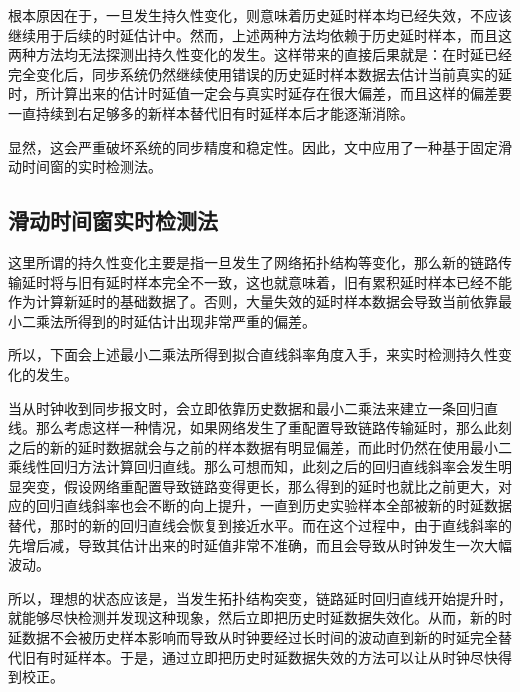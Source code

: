 根本原因在于，一旦发生持久性变化，则意味着历史延时样本均已经失效，不应该继续用于后续的时延估计中。然而，上述两种方法均依赖于历史延时样本，而且这两种方法均无法探测出持久性变化的发生。这样带来的直接后果就是：在时延已经完全变化后，同步系统仍然继续使用错误的历史延时样本数据去估计当前真实的延时，所计算出来的估计时延值一定会与真实时延存在很大偏差，而且这样的偏差要一直持续到右足够多的新样本替代旧有时延样本后才能逐渐消除。

显然，这会严重破坏系统的同步精度和稳定性。因此，文中应用了一种基于固定滑动时间窗的实时检测法。

\subsection{滑动时间窗实时检测法}
这里所谓的持久性变化主要是指一旦发生了网络拓扑结构等变化，那么新的链路传输延时将与旧有延时样本完全不一致，这也就意味着，旧有累积延时样本已经不能作为计算新延时的基础数据了。否则，大量失效的延时样本数据会导致当前依靠最小二乘法所得到的时延估计出现非常严重的偏差。

所以，下面会上述最小二乘法所得到拟合直线斜率角度入手，来实时检测持久性变化的发生。

当从时钟收到同步报文时，会立即依靠历史数据和最小二乘法来建立一条回归直线。那么考虑这样一种情况，如果网络发生了重配置导致链路传输延时，那么此刻之后的新的延时数据就会与之前的样本数据有明显偏差，而此时仍然在使用最小二乘线性回归方法计算回归直线。那么可想而知，此刻之后的回归直线斜率会发生明显突变，假设网络重配置导致链路变得更长，那么得到的延时也就比之前更大，对应的回归直线斜率也会不断的向上提升，一直到历史实验样本全部被新的时延数据替代，那时的新的回归直线会恢复到接近水平。而在这个过程中，由于直线斜率的先增后减，导致其估计出来的时延值非常不准确，而且会导致从时钟发生一次大幅波动。

所以，理想的状态应该是，当发生拓扑结构突变，链路延时回归直线开始提升时，就能够尽快检测并发现这种现象，然后立即把历史时延数据失效化。从而，新的时延数据不会被历史样本影响而导致从时钟要经过长时间的波动直到新的时延完全替代旧有时延样本。于是，通过立即把历史时延数据失效的方法可以让从时钟尽快得到校正。

